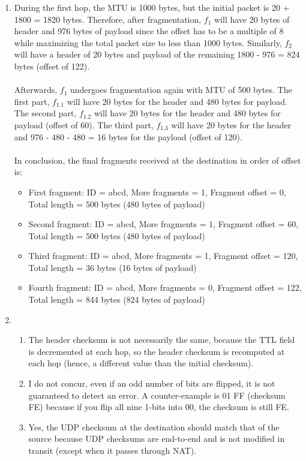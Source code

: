 \documentclass[12pt]{article}
\begin{document}
\begin{enumerate}
	\item %
	During the first hop, the MTU is 1000 bytes, but the initial packet is 20 + 1800 = 1820 bytes. Therefore, after fragmentation, $f_1$ will have 20 bytes of header and 976 bytes of payload since the offset has to be a multiple of 8 while maximizing the total packet size to less than 1000 bytes.  Similarly, $f_2$ will have a header of 20 bytes and payload of the remaining 1800 - 976 = 824 bytes (offset of 122). \\ \\ Afterwards, $f_1$ undergoes fragmentation again with MTU of 500 bytes. The first part, $f_1.1$ will have 20 bytes for the header and 480 bytes for payload. The second part, $f_1.2$ will have 20 bytes for the header and 480 bytes for payload (offset of 60). The third part, $f_1.3$ will have 20 bytes for the header and 976 - 480 - 480 = 16 bytes for the payload (offset of 120). \\ \\ In conclusion, the final fragments received at the destination in order of offset is:
	\begin{itemize}
		\item First fragment: ID = abcd, More fragments = 1, Fragment offset = 0, Total length = 500 bytes (480 bytes of payload)
		\item Second fragment: ID = abcd, More fragments = 1, Fragment offset = 60, Total length = 500 bytes (480 bytes of payload)
		\item Third fragment: ID = abcd, More fragments = 1, Fragment offset = 120, Total length = 36 bytes (16 bytes of payload)
		\item Fourth fragment: ID = abcd, More fragments = 0, Fragment offset = 122, Total length = 844 bytes (824 bytes of payload)
	\end{itemize}
	\item %
	\begin{enumerate}
		\item The header checksum is not necessarily the same, because the TTL field is decremented at each hop, so the header checksum is recomputed at each hop (hence, a different value than the initial checksum).
		\item I do not concur, even if an odd number of bits are flipped, it is not guaranteed to detect an error. A counter-example is 01 FF (checksum FE) because if you flip all nine 1-bits into 00, the checksum is still FE.
		\item Yes, the UDP checksum at the destination should match that of the source because UDP checksums are end-to-end and is not modified in transit (except when it passes through NAT). 

\end{enumerate}
\end{enumerate}
\end{document}
